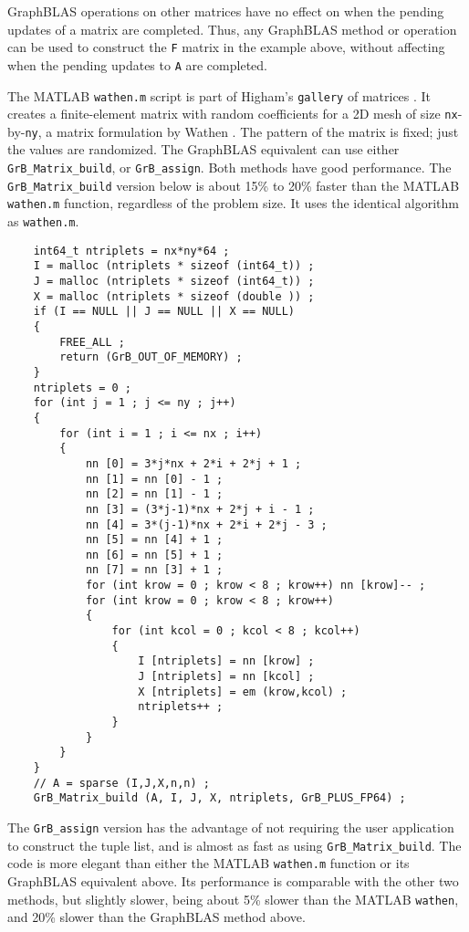 \documentclass[12pt]{article}
\begin{document}
{GraphBLAS operations on other matrices have no effect on when the pending
updates of a matrix are completed.  Thus, any GraphBLAS method or operation can
be used to construct the \verb'F' matrix in the example above, without
affecting when the pending updates to \verb'A' are completed.

The MATLAB \verb'wathen.m' script is part of Higham's \verb'gallery' of
matrices \cite{Higham}.  It creates a finite-element matrix with random
coefficients for a 2D mesh of size \verb'nx'-by-\verb'ny', a matrix formulation
by Wathen \cite{Wathen}.  The pattern of the matrix is fixed; just the values
are randomized.  The GraphBLAS equivalent can use either
\verb'GrB_Matrix_build', or \verb'GrB_assign'.  Both methods have good
performance.  The \verb'GrB_Matrix_build' version below is about 15\% to 20\%
faster than the MATLAB \verb'wathen.m' function, regardless of the problem
size.  It uses the identical algorithm as \verb'wathen.m'.

    {\footnotesize
    \begin{verbatim}
    int64_t ntriplets = nx*ny*64 ;
    I = malloc (ntriplets * sizeof (int64_t)) ;
    J = malloc (ntriplets * sizeof (int64_t)) ;
    X = malloc (ntriplets * sizeof (double )) ;
    if (I == NULL || J == NULL || X == NULL)
    {
        FREE_ALL ;
        return (GrB_OUT_OF_MEMORY) ;
    }
    ntriplets = 0 ;
    for (int j = 1 ; j <= ny ; j++)
    {
        for (int i = 1 ; i <= nx ; i++)
        {
            nn [0] = 3*j*nx + 2*i + 2*j + 1 ;
            nn [1] = nn [0] - 1 ;
            nn [2] = nn [1] - 1 ;
            nn [3] = (3*j-1)*nx + 2*j + i - 1 ;
            nn [4] = 3*(j-1)*nx + 2*i + 2*j - 3 ;
            nn [5] = nn [4] + 1 ;
            nn [6] = nn [5] + 1 ;
            nn [7] = nn [3] + 1 ;
            for (int krow = 0 ; krow < 8 ; krow++) nn [krow]-- ;
            for (int krow = 0 ; krow < 8 ; krow++)
            {
                for (int kcol = 0 ; kcol < 8 ; kcol++)
                {
                    I [ntriplets] = nn [krow] ;
                    J [ntriplets] = nn [kcol] ;
                    X [ntriplets] = em (krow,kcol) ;
                    ntriplets++ ;
                }
            }
        }
    }
    // A = sparse (I,J,X,n,n) ;
    GrB_Matrix_build (A, I, J, X, ntriplets, GrB_PLUS_FP64) ; \end{verbatim}}

The \verb'GrB_assign' version has the advantage of not requiring the
user application to construct the tuple list, and is almost as fast as using
\verb'GrB_Matrix_build'.  The code is more elegant than either the MATLAB
\verb'wathen.m' function or its GraphBLAS equivalent above.  Its performance is
comparable with the other two methods, but slightly slower, being about 5\%
slower than the MATLAB \verb'wathen', and 20\% slower than the GraphBLAS
method above.

}
\end{document}
